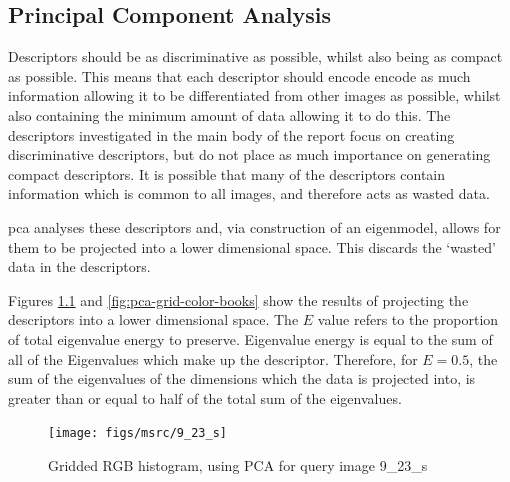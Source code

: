 \clearpage
\begin{appendices}

\chapter{Principal Component Analysis} \label{app:pca}
Descriptors should be as discriminative as possible, whilst also being as compact as possible. This means that each descriptor should encode encode as much information allowing it to be differentiated from other images as possible, whilst also containing the minimum amount of data allowing it to do this. The descriptors investigated in the main body of the report focus on creating discriminative descriptors, but do not place as much importance on generating compact descriptors. It is possible that many of the descriptors contain information which is common to all images, and therefore acts as wasted data.

\Gls{pca} analyses these descriptors and, via construction of an eigenmodel, allows for them to be projected into a lower dimensional space. This discards the `wasted' data in the descriptors.

Figures \ref{fig:pca-grid-color-sheep} and \ref{fig:pca-grid-color-books} show the results of projecting the descriptors into a lower dimensional space.  The $E$ value refers to the proportion of total eigenvalue energy to preserve. Eigenvalue energy is equal to the sum of all of the Eigenvalues which make up the descriptor. Therefore, for $E=0.5$, the sum of the eigenvalues of the dimensions which the data is projected into, is greater than or equal to half of the total sum of the eigenvalues.


\begin{figure}[ht]
	\begin{minipage}[]{0.3\linewidth}
		\centering
		\texttt{[image: figs/msrc/9\_23\_s]}
	\end{minipage}
	\begin{minipage}[]{0.7\linewidth}
		\centering
	\end{minipage}
	\caption{Gridded RGB histogram, using PCA for query image 9\_23\_s}
	\label{fig:pca-grid-color-sheep}
\end{figure}


\end{appendices}
